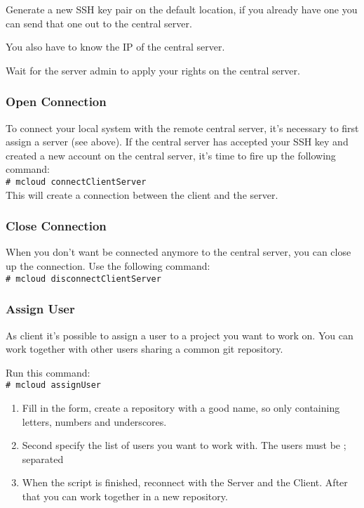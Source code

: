 \documentclass{article}
\newcommand{\shellcmd}[1]{\\\indent\indent\texttt{\footnotesize\# #1}\\}
\begin{document}
Generate a new SSH key pair on the default location, if you already have one you can send that one out to the central server.

You also have to know the IP of the central server. 

Wait for the server admin to apply your rights on the central server.

\subsubsection{Open Connection}
To connect your local system with the remote central server, it's necessary to first assign a server (see above). If the central server has accepted your SSH key and created a new account on the central server, it's time to fire up the following command:
\shellcmd{mcloud connectClientServer}

This will create a connection between the client and the server.

\subsubsection{Close Connection}

When you don't want be connected anymore to the central server, you can close up the connection.
Use the following command:
\shellcmd{mcloud disconnectClientServer}

\subsubsection{Assign User}

As client it's possible to assign a user to a project you want to work on. You can work together with other users sharing a common git repository. 

Run this command: 
\shellcmd{mcloud assignUser}

\begin{enumerate}
\item Fill in the form, create a repository with a good name, so only containing letters, numbers and underscores.
\item Second specify the list of users you want to work with. The users must be ; separated
\item When the script is finished, reconnect with the Server and the Client. After that you can work together in a new repository.
\end{enumerate}
\end{document}

